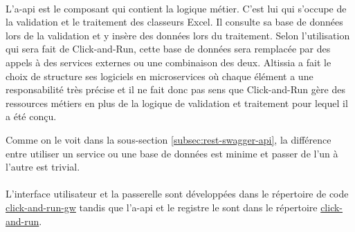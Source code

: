 \paragraph{}
L'\gls{a-api} est le composant qui contient la logique métier.
C'est lui qui s'occupe de la validation et le traitement des classeurs Excel.
Il consulte sa base de données lors de la validation et y insère des données lors du traitement.
Selon l'utilisation qui sera fait de Click-and-Run, cette base de données sera remplacée par des appels à des services externes ou une combinaison des deux.
Altissia a fait le choix de structure ses logiciels en microservices où chaque élément a une responsabilité très précise et il ne fait donc pas sens que Click-and-Run gère des ressources métiers en plus de la logique de validation et traitement pour lequel il a été conçu.

Comme on le voit dans la sous-section \ref{subsec:rest-swagger-api}, la différence entre utiliser un service ou une base de données est minime et passer de l'un à l'autre est trivial.

\paragraph{}
L'interface utilisateur et la passerelle sont développées dans le répertoire de code \href{https://github.com/click-and-run/click-and-run-gw}{click-and-run-gw}\fnmark{} tandis que l'\gls{a-api} et le registre le sont dans le répertoire \href{https://github.com/click-and-run/click-and-run}{click-and-run}\fnmark{}.





